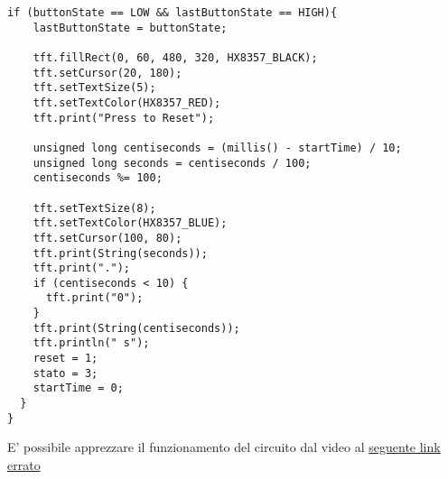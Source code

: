 \clearpage
\begin{lstlisting}[frame=single, language=Arduino]
  if (buttonState == LOW && lastButtonState == HIGH){
    lastButtonState = buttonState;

    tft.fillRect(0, 60, 480, 320, HX8357_BLACK);
    tft.setCursor(20, 180);
    tft.setTextSize(5);
    tft.setTextColor(HX8357_RED);
    tft.print("Press to Reset");

    unsigned long centiseconds = (millis() - startTime) / 10;
    unsigned long seconds = centiseconds / 100;
    centiseconds %= 100;

    tft.setTextSize(8);
    tft.setTextColor(HX8357_BLUE);
    tft.setCursor(100, 80);
    tft.print(String(seconds));
    tft.print(".");
    if (centiseconds < 10) {
      tft.print("0");
    }
    tft.print(String(centiseconds));
    tft.println(" s");
    reset = 1;
    stato = 3;
    startTime = 0;
  }
}
\end{lstlisting}
E' possibile apprezzare il funzionamento del circuito dal video al \href{}{seguente link errato} 
